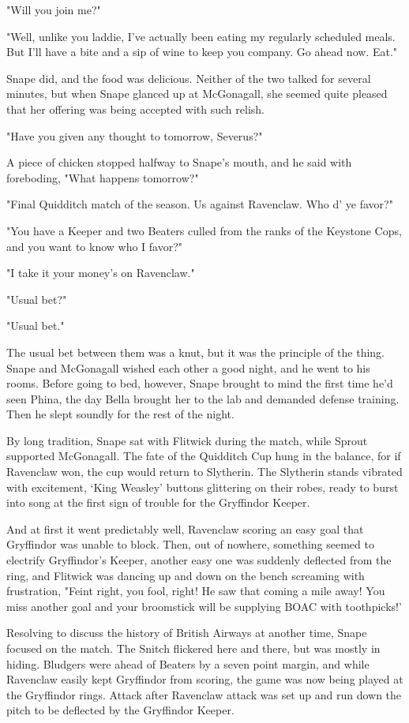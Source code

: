 "Will you join me?"

"Well, unlike you laddie, I've actually been eating my regularly scheduled meals. But I'll have a bite and a sip of wine to keep you company. Go ahead now. Eat."

Snape did, and the food was delicious. Neither of the two talked for several minutes, but when Snape glanced up at McGonagall, she seemed quite pleased that her offering was being accepted with such relish.

"Have you given any thought to tomorrow, Severus?"

A piece of chicken stopped halfway to Snape's mouth, and he said with foreboding, "What happens tomorrow?"

"Final Quidditch match of the season. Us against Ravenclaw. Who d' ye favor?"

"You have a Keeper and two Beaters culled from the ranks of the Keystone Cops, and you want to know who I favor?"

"I take it your money's on Ravenclaw."

"Usual bet?"

"Usual bet."

The usual bet between them was a knut, but it was the principle of the thing. Snape and McGonagall wished each other a good night, and he went to his rooms. Before going to bed, however, Snape brought to mind the first time he'd seen Phina, the day Bella brought her to the lab and demanded defense training. Then he slept soundly for the rest of the night.

By long tradition, Snape sat with Flitwick during the match, while Sprout supported McGonagall. The fate of the Quidditch Cup hung in the balance, for if Ravenclaw won, the cup would return to Slytherin. The Slytherin stands vibrated with excitement, `King Weasley' buttons glittering on their robes, ready to burst into song at the first sign of trouble for the Gryffindor Keeper.

And at first it went predictably well, Ravenclaw scoring an easy goal that Gryffindor was unable to block. Then, out of nowhere, something seemed to electrify Gryffindor's Keeper, another easy one was suddenly deflected from the ring, and Flitwick was dancing up and down on the bench screaming with frustration, "Feint right, you fool, right! He saw that coming a mile away! You miss another goal and your broomstick will be supplying BOAC with toothpicks!'

Resolving to discuss the history of British Airways at another time, Snape focused on the match. The Snitch flickered here and there, but was mostly in hiding. Bludgers were ahead of Beaters by a seven point margin, and while Ravenclaw easily kept Gryffindor from scoring, the game was now being played at the Gryffindor rings. Attack after Ravenclaw attack was set up and run down the pitch to be deflected by the Gryffindor Keeper.

